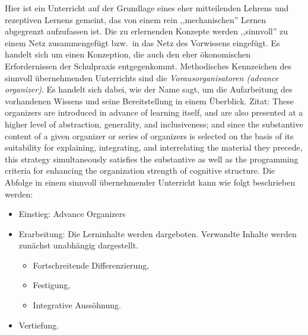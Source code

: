 Hier ist ein Unterricht auf der Grundlage eines
eher mitteilenden Lehrens und rezeptiven Lernens
gemeint, das von einem rein ,,mechanischen''
Lernen abgegrenzt aufzufassen ist.
Die zu erlernenden Konzepte werden ,,sinnvoll''
zu einem Netz zusammengef\"{u}gt bzw.\ in das Netz des Vorwissens
eingef\"{u}gt.
\bip
Es handelt sich um einen Konzeption, die auch den eher \"{o}konomischen
Erfordernissen der Schulpraxis entgegenkommt.
\bip
Methodisches Kennzeichen des sinnvoll \"{u}bernehmenden Unterrichts
sind die {\it Vorausorganisatoren (advance organizer)}.
Es handelt sich dabei, wie der Name sagt, um die Aufarbeitung
des vorhandenen Wissens und seine Bereitstellung in einem
\"{U}berblick.
\bip
Zitat: These organizers are introduced in advance of
learning itself, and are also presented at a higher level
of abstraction, generality, and inclusiveness; and since
the substantive content of a given organizer or
series of organizers is selected on the basis of its
suitability for explaining, integrating, and interrelating the
material they precede, this strategy simultaneously satisfies the
substantive as well as the programming criteria for enhancing
the organization strength of cognitive structure.
\bip
Die Abfolge in einem sinnvoll \"{u}bernehmender Unterricht
kann wie folgt beschrieben werden:
\begin{itemize}
\item Einstieg: Advance Organizers
\item Erarbeitung: Die Lerninhalte werden dargeboten.
Verwandte Inhalte werden zun\"{a}chst unabh\"{a}ngig dargestellt.
\begin{itemize}
\item Fortschreitende Differenzierung,
\item Festigung,
\item Integrative Auss\"{o}hnung.
\end{itemize}
\item Vertiefung.
\end{itemize}



